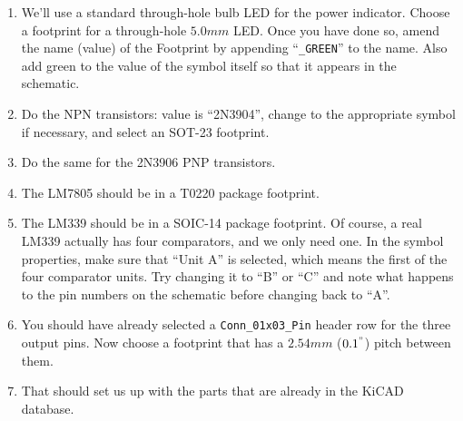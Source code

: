 \documentclass[
  letterpaper,
  DIV=11,
  numbers=noendperiod,
  oneside]{scrartcl}
\begin{document}
\begin{enumerate}
  \begin{tcolorbox}[enhanced jigsaw, opacityback=0, left=2mm, rightrule=.15mm, breakable, arc=.35mm, opacitybacktitle=0.6, colbacktitle=quarto-callout-note-color!10!white, bottomrule=.15mm, toprule=.15mm, colback=white, colframe=quarto-callout-note-color-frame, leftrule=.75mm, bottomtitle=1mm, toptitle=1mm, titlerule=0mm, title=\textcolor{quarto-callout-note-color}{\faInfo}\hspace{0.5em}{Note}, coltitle=black]

  Neatness always counts! As you change the display values of some of
  these symbols, take the time to move the labels on the schematic
  around to make it easy to read the values. In particular, avoid labels
  overlapping with symbols or wires. Remember you can rotate labels,
  too.

  \end{tcolorbox}
\item
  We'll use a standard through-hole bulb LED for the power indicator.
  Choose a footprint for a through-hole \(5.0mm\) LED. Once you have
  done so, amend the name (value) of the Footprint by appending
  ``\texttt{\_GREEN}'' to the name. Also add green to the value of the
  symbol itself so that it appears in the schematic.
\item
  Do the NPN transistors: value is ``2N3904'', change to the appropriate
  symbol if necessary, and select an SOT-23 footprint.
\item
  Do the same for the 2N3906 PNP transistors.
\item
  The LM7805 should be in a T0220 package footprint.
\item
  The LM339 should be in a SOIC-14 package footprint. Of
  course, a real LM339 actually has four comparators, and we only need
  one. In the symbol properties, make sure that ``Unit A'' is selected,
  which means the first of the four comparator units. Try changing it to
  ``B'' or ``C'' and note what happens to the pin numbers on the
  schematic before changing back to ``A''.
\item
  You should have already selected a \texttt{Conn\_01x03\_Pin} header
  row for the three output pins. Now choose a footprint that has a
  \(2.54mm\) (\(0.1^"\)) pitch between them.
\item
  That should set us up with the parts that are already in the KiCAD
  database.
\end{enumerate}
\end{document}
